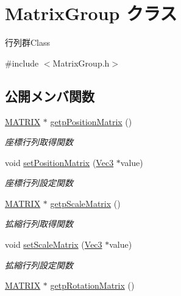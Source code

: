 \hypertarget{class_matrix_group}{}\section{Matrix\+Group クラス}
\label{class_matrix_group}


行列群\+Class  




{\ttfamily \#include $<$Matrix\+Group.\+h$>$}

\subsection*{公開メンバ関数}
\begin{DoxyCompactItemize}
\item 
\mbox{\hyperlink{_matrix_8h_a032295cd9fb1b711757c90667278e744}{M\+A\+T\+R\+IX}} $\ast$ \mbox{\hyperlink{class_matrix_group_a98e52fd85547a0ce918072170e15ea9e}{getp\+Position\+Matrix}} ()
\begin{DoxyCompactList}\small\item\em 座標行列取得関数 \end{DoxyCompactList}\item 
void \mbox{\hyperlink{class_matrix_group_afbf74f4d668b5d6e714d18e3acfc0a4c}{set\+Position\+Matrix}} (\mbox{\hyperlink{_vector3_d_8h_ab16f59e4393f29a01ec8b9bbbabbe65d}{Vec3}} $\ast$value)
\begin{DoxyCompactList}\small\item\em 座標行列設定関数 \end{DoxyCompactList}\item 
\mbox{\hyperlink{_matrix_8h_a032295cd9fb1b711757c90667278e744}{M\+A\+T\+R\+IX}} $\ast$ \mbox{\hyperlink{class_matrix_group_ad7b235e886ef5fcd23ef4ee4377a57fd}{getp\+Scale\+Matrix}} ()
\begin{DoxyCompactList}\small\item\em 拡縮行列取得関数 \end{DoxyCompactList}\item 
void \mbox{\hyperlink{class_matrix_group_a16af3b64cf34bfa18a61aadc9cdb2ba9}{set\+Scale\+Matrix}} (\mbox{\hyperlink{_vector3_d_8h_ab16f59e4393f29a01ec8b9bbbabbe65d}{Vec3}} $\ast$value)
\begin{DoxyCompactList}\small\item\em 拡縮行列設定関数 \end{DoxyCompactList}\item 
\mbox{\hyperlink{_matrix_8h_a032295cd9fb1b711757c90667278e744}{M\+A\+T\+R\+IX}} $\ast$ \mbox{\hyperlink{class_matrix_group_a927f610535d5e9e308db0a42dc4fab65}{getp\+Rotation\+Matrix}} ()

\end{DoxyCompactItemize}
